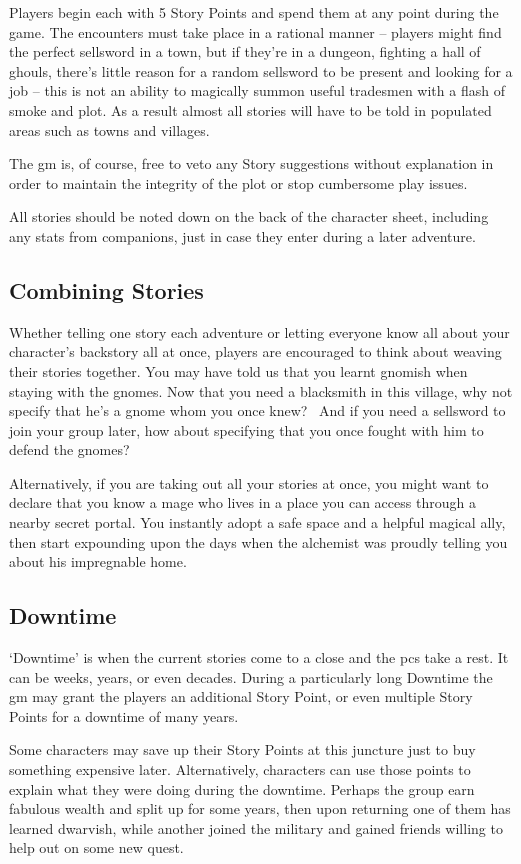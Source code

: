 \begin{multicols}{2}

Players begin each with 5 Story Points and spend them at any point during the game. The encounters must take place in a rational manner -- players might find the perfect sellsword in a town, but if they're in a dungeon, fighting a hall of ghouls, there's little reason for a random sellsword to be present and looking for a job -- this is not an ability to magically summon useful tradesmen with a flash of smoke and plot. As a result almost all stories will have to be told in populated areas such as towns and villages.

The \gls{gm} is, of course, free to veto any Story suggestions without explanation in order to maintain the integrity of the plot or stop cumbersome play issues.

All stories should be noted down on the back of the character sheet, including any stats from companions, just in case they enter during a later adventure.

\subsection{Combining Stories}

Whether telling one story each adventure or letting everyone know all about your character's backstory all at once, players are encouraged to think about weaving their stories together. You may have told us that you learnt gnomish when staying with the gnomes. Now that you need a blacksmith in this village, why not specify that he's a gnome whom you once knew? \ And if you need a sellsword to join your group later, how about specifying that you once fought with him to defend the gnomes?

Alternatively, if you are taking out all your stories at once, you might want to declare that you know a mage who lives in a place you can access through a nearby secret portal. You instantly adopt a safe space and a helpful magical ally, then start expounding upon the days when the alchemist was proudly telling you about his impregnable home.

\subsection{Downtime}

`Downtime' is when the current stories come to a close and the \glspl{pc} take a rest.
It can be weeks, years, or even decades.
During a particularly long Downtime the \gls{gm} may grant the players an additional Story Point, or even multiple Story Points for a downtime of many years.

Some characters may save up their Story Points at this juncture just to buy something expensive later.  Alternatively, characters can use those points to explain what they were doing during the \gls{downtime}.  Perhaps the group earn fabulous wealth and split up for some years, then upon returning one of them has learned dwarvish, while another joined the military and gained friends willing to help out on some new quest.

\end{multicols}

